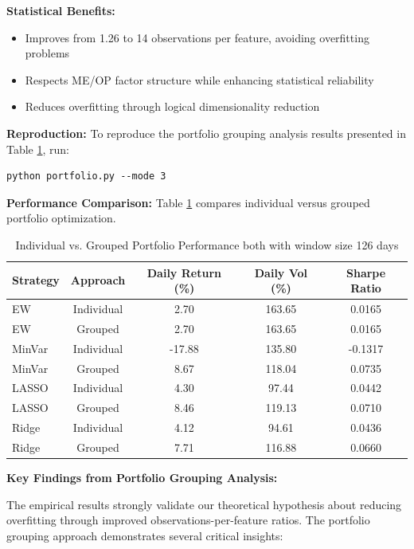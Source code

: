 \documentclass[12pt]{article}
\begin{document}
\textbf{Statistical Benefits:}
\begin{itemize}
    \item Improves from 1.26 to 14 observations per feature, avoiding overfitting problems
    \item Respects ME/OP factor structure while enhancing statistical reliability
    \item Reduces overfitting through logical dimensionality reduction
\end{itemize}

\textbf{Reproduction:}
To reproduce the portfolio grouping analysis results presented in Table \ref{tab:grouping_comparison}, run:
\begin{lstlisting}
python portfolio.py --mode 3
\end{lstlisting}

\textbf{Performance Comparison:}
Table \ref{tab:grouping_comparison} compares individual versus grouped portfolio optimization.

\begin{table}[h]
\centering
\caption{Individual vs. Grouped Portfolio Performance both with window size 126 days}
\label{tab:grouping_comparison}
\begin{tabular}{lcccc}
\hline
Strategy & Approach & Daily Return (\%) & Daily Vol (\%) & Sharpe Ratio \\
\hline
EW & Individual & 2.70 & 163.65 & 0.0165 \\
EW & Grouped & 2.70 & 163.65 & 0.0165 \\
MinVar & Individual & -17.88 & 135.80 & -0.1317 \\
MinVar & Grouped & 8.67 & 118.04 & 0.0735 \\
LASSO & Individual & 4.30 & 97.44 & 0.0442 \\
LASSO & Grouped & 8.46 & 119.13 & 0.0710 \\
Ridge & Individual & 4.12 & 94.61 & 0.0436 \\
Ridge & Grouped & 7.71 & 116.88 & 0.0660 \\
\hline
\end{tabular}
\end{table}

\textbf{Key Findings from Portfolio Grouping Analysis:}

The empirical results strongly validate our theoretical hypothesis about reducing overfitting through improved observations-per-feature ratios. The portfolio grouping approach demonstrates several critical insights:
\end{document}

